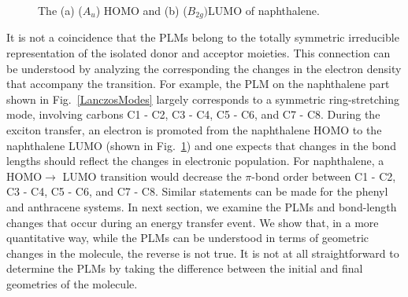 \begin{figure}[th]
\caption{The (a)  ($A_{u}$) HOMO and (b)  ($B_{2g}) $LUMO of naphthalene.\label{naphHOMOLUMO}}
\end{figure}


It is not a coincidence that the PLMs belong to the totally symmetric irreducible representation of the isolated donor and acceptor moieties.
This connection can be understood by analyzing the corresponding  the changes in the electron density that accompany the transition.
For example, the PLM on the naphthalene part shown in  Fig.~\ref{LanczosModes}
largely corresponds to a symmetric ring-stretching mode,  involving carbons
C1 - C2, C3 - C4, C5 - C6, and C7 - C8.
During the exciton transfer, an electron is promoted from the naphthalene HOMO to the naphthalene LUMO (shown in Fig.~\ref{naphHOMOLUMO})
and one expects that changes in the bond lengths should reflect the changes in
electronic population.
For naphthalene, a HOMO$\to$ LUMO transition would
decrease the $\pi$-bond order between C1 - C2, C3 - C4, C5 - C6, and C7 - C8.
Similar statements can be made for the phenyl and anthracene systems.
In next section,  we examine the PLMs and bond-length changes that occur during an energy  transfer event.
We show that, in a more quantitative way,   while the  PLMs can be understood in terms of
geometric changes in the molecule,  the reverse is not true.
It is not at all straightforward to determine the PLMs by taking the difference between the initial
and final geometries of the molecule.

